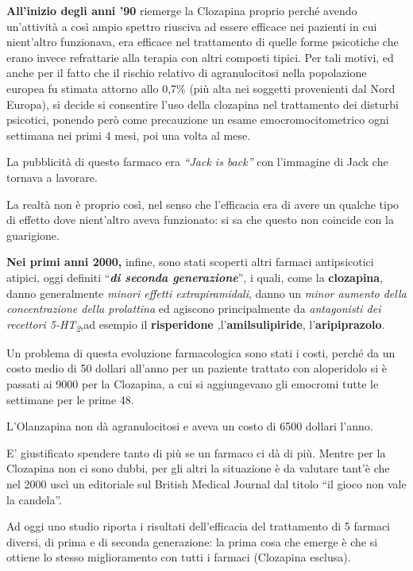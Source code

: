 \documentclass[]{article}
\begin{document}
\textbf{All'inizio degli anni '90} riemerge la Clozapina proprio perché
avendo un'attività a così ampio spettro riusciva ad essere efficace nei
pazienti in cui nient'altro funzionava, era efficace nel trattamento di
quelle forme psicotiche che erano invece refrattarie alla terapia con
altri composti tipici. Per tali motivi, ed anche per il fatto che il
rischio relativo di agranulocitosi nella popolazione europea fu stimata
attorno allo 0,7\% (più alta nei soggetti provenienti dal Nord Europa),
si decide si consentire l'uso della clozapina nel trattamento dei
disturbi psicotici, ponendo però come precauzione un esame
emocromocitometrico ogni settimana nei primi 4 mesi, poi una volta al
mese.

La pubblicità di questo farmaco era \emph{``Jack is back''} con
l'immagine di Jack che tornava a lavorare.

La realtà non è proprio così, nel senso che l'efficacia era di avere un
qualche tipo di effetto dove nient'altro aveva funzionato: si sa che
questo non coincide con la guarigione.

\textbf{Nei primi anni 2000,} infine, sono stati scoperti altri farmaci
antipsicotici atipici, oggi definiti ``\textbf{\emph{di seconda
generazione}}'', i quali, come la \textbf{clozapina}, danno generalmente
\emph{minori effetti extrapiramidali}, danno un \emph{minor aumento
della concentrazione della prolattina} ed agiscono principalmente da
\emph{antagonisti dei recettori 5-HT\textsubscript{2}},ad esempio il
\textbf{risperidone} \emph{,}l'\textbf{amilsulipiride},
l'\textbf{aripiprazolo}.

Un problema di questa evoluzione farmacologica sono stati i costi,
perché da un costo medio di 50 dollari all'anno per un paziente trattato
con aloperidolo si è passati ai 9000 per la Clozapina, a cui si
aggiungevano gli emocromi tutte le settimane per le prime 48.

L'Olanzapina non dà agranulocitosi e aveva un costo di 6500 dollari
l'anno.

E' giustificato spendere tanto di più se un farmaco ci dà di più. Mentre
per la Clozapina non ci sono dubbi, per gli altri la situazione è da
valutare tant'è che nel 2000 uscì un editoriale sul British Medical
Journal dal titolo ``il gioco non vale la candela''.

Ad oggi uno studio riporta i risultati dell'efficacia del trattamento di
5 farmaci diversi, di prima e di seconda generazione: la prima cosa che
emerge è che si ottiene lo stesso miglioramento con tutti i farmaci
(Clozapina esclusa).
\end{document}

